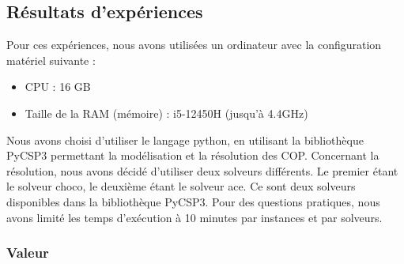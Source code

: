 \documentclass[a4paper, 10pt]{article}
\begin{document}
    \subsection{Résultats d'expériences}

      Pour ces expériences, nous avons utilisées un ordinateur avec la configuration matériel suivante :
      \begin{itemize}
        \item CPU : 16 GB
        \item Taille de la RAM (mémoire) : i5-12450H  (jusqu'à 4.4GHz)
      \end{itemize}

      Nous avons choisi d'utiliser le langage python, en utilisant la bibliothèque PyCSP3 permettant la modélisation et la résolution des COP. Concernant la résolution, nous avons décidé d'utiliser deux solveurs différents. Le premier étant le solveur choco, le deuxième étant le solveur ace. Ce sont deux solveurs disponibles dans la bibliothèque PyCSP3. Pour des questions pratiques, nous avons limité les temps d'exécution à 10 minutes par instances et par solveurs.

      \subsubsection{Valeur}
\end{document}
